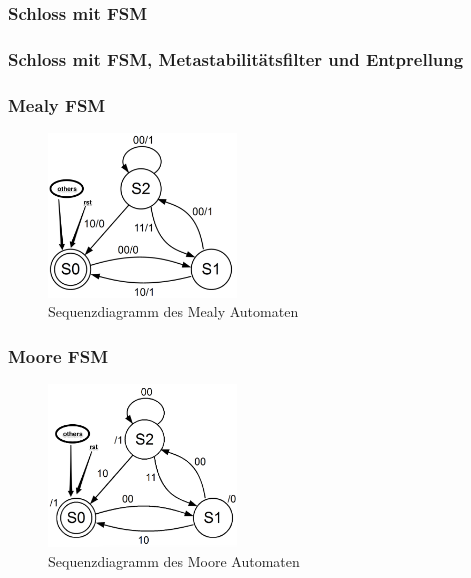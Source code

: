 \subsubsection{Schloss mit FSM}


\subsubsection{Schloss mit FSM, Metastabilitätsfilter und Entprellung}


\newpage
\subsubsection{Mealy FSM}


\begin{figure}[htbp]
	\centering
		\includegraphics[width=5cm]{content/bilder/fsm_mealy.png}
	\caption{Sequenzdiagramm des Mealy Automaten}%
	\label{Mealy}
\end{figure}

\newpage
\subsubsection{Moore FSM}


\begin{figure}[htbp]
	\centering
		\includegraphics[width=5cm]{content/bilder/fsm_moore.png}
	\caption{Sequenzdiagramm des Moore Automaten}%
	\label{Moore}
\end{figure}
